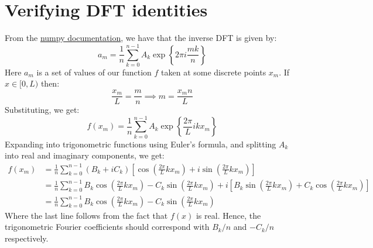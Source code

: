 \documentclass[reqno]{article}
\begin{document}
\section{Verifying DFT identities}
From the \href{https://numpy.org/doc/stable/reference/routines.fft.html#implementation-details}{numpy documentation}, we have that the inverse DFT is given by:
\begin{equation}
    a_m
    =
    \frac{1}{n} \sum_{k = 0}^{n - 1} A_k \exp \left\{ 2\pi i \frac{mk}{n} \right\}
\end{equation}
Here $a_m$ is a set of values of our function $f$ taken at some discrete points $x_m$.
If $x \in [0, L)$ then:
\begin{equation}
    \frac{x_m}{L} = \frac{m}{n}
    \implies
    m = \frac{x_m n}{L}
\end{equation}
Substituting, we get:
\begin{equation}
    f(x_m)
    =
    \frac{1}{n}
    \sum_{k = 0}^{n - 1}
    A_k \exp \left\{ \frac{2 \pi}{L} i k x_m \right\}
\end{equation}
Expanding into trigonometric functions using Euler's formula, and splitting $A_k$ into real and imaginary components, we get:
\begin{equation} \label{eq:trig-from-fourier}
    \begin{split}
        f(x_m)
        &=
        \frac{1}{n}
        \sum_{k = 0}^{n - 1}
        \left(B_k + i C_k \right) \left[
            \cos\left(\frac{2\pi}{L} k x_m\right)
            + i \sin\left(\frac{2\pi}{L} k x_m \right)
        \right] \\
        &=
        \frac{1}{n}
        \sum_{k = 0}^{n - 1}
            B_k \cos\left(\frac{2\pi}{L} k x_m\right)
            - C_k \sin\left(\frac{2\pi}{L} k x_m \right)
            + i \left[
                B_k \sin\left(\frac{2\pi}{L} k x_m \right)
                + C_k \cos\left(\frac{2\pi}{L} k x_m\right)
            \right] \\
        &=
        \frac{1}{n}
        \sum_{k = 0}^{n - 1}
            B_k \cos\left(\frac{2\pi}{L} k x_m\right)
            - C_k \sin\left(\frac{2\pi}{L} k x_m \right)
    \end{split}
\end{equation}
Where the last line follows from the fact that $f(x)$ is real.
Hence, the trigonometric Fourier coefficients should correspond with $B_k / n$ and $-C_k / n$ respectively.
\end{document}
